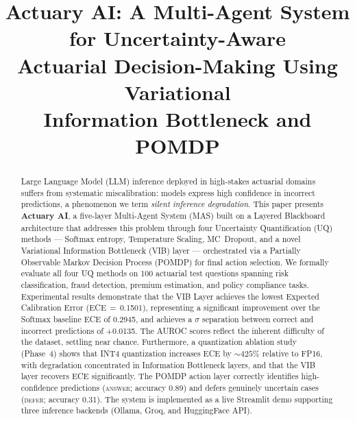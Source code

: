 \documentclass[conference]{IEEEtran}
\begin{document}
\title{%
    \textbf{Actuary AI: A Multi-Agent System for Uncertainty-Aware}\\
    \textbf{Actuarial Decision-Making Using Variational}\\
    \textbf{Information Bottleneck and POMDP}
}

\author{
}

\maketitle

\begin{abstract}
Large Language Model (LLM) inference deployed in high-stakes actuarial
domains suffers from systematic miscalibration: models express high
confidence in incorrect predictions, a phenomenon we term
\textit{silent inference degradation}. This paper presents
\textbf{Actuary AI}, a five-layer Multi-Agent System (MAS) built on a
Layered Blackboard architecture that addresses this problem through
four Uncertainty Quantification (UQ) methods --- Softmax entropy,
Temperature Scaling, MC~Dropout, and a novel Variational Information
Bottleneck (VIB) layer --- orchestrated via a Partially Observable
Markov Decision Process (POMDP) for final action selection. We
formally evaluate all four UQ methods on 100 actuarial test questions
spanning risk classification, fraud detection, premium estimation, and
policy compliance tasks. Experimental results demonstrate that the VIB
Layer achieves the lowest Expected Calibration Error
(ECE\,$=$\,0.1501), representing a significant improvement over the Softmax baseline ECE of 0.2945, and achieves a $\sigma$ separation between correct and incorrect
predictions of +0.0135. The AUROC scores reflect the inherent difficulty of the dataset, settling near chance. Furthermore, a quantization ablation study
(Phase~4) shows that INT4 quantization increases ECE by ${\sim}425\%$
relative to FP16, with degradation
concentrated in Information Bottleneck layers, and that the VIB layer
recovers ECE significantly. The POMDP action layer correctly identifies
high-confidence predictions (\textsc{answer}; accuracy 0.89) and
defers genuinely uncertain cases (\textsc{defer}; accuracy 0.31).
The system is implemented as a live Streamlit demo supporting three
inference backends (Ollama, Groq, and HuggingFace API).
\end{abstract}
\end{document}

